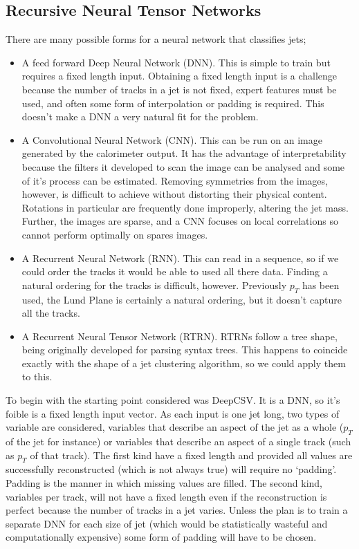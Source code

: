 \FloatBarrier
\subsection{Recursive Neural Tensor Networks}
There are many possible forms for a neural network that classifies jets;
\begin{itemize}
    \item A feed forward Deep Neural Network (DNN). This is simple to train but requires a fixed length input.
        Obtaining a fixed length input is a challenge because the number of tracks in a jet is not fixed,
        expert features must be used, and often some form of interpolation or padding is required. 
        This doesn't make a DNN a very natural fit for the problem.
    \item A Convolutional Neural Network (CNN). This can be run on an image generated by the calorimeter output.
        It has the advantage of interpretability because the filters it developed to scan the image can be analysed and some of it's process can be estimated.
        Removing symmetries from the images, however, is difficult to achieve without distorting their physical content.
        Rotations in particular are frequently done improperly, altering the jet mass.
        Further, the images are sparse, and a CNN focuses on local correlations so cannot perform optimally on spares images.
    \item A Recurrent Neural Network (RNN). This can read in a sequence, so if we could order the tracks it would be able to used all there data.
        Finding a natural ordering for the tracks is difficult, however.
        Previously \(p_T\) has been used, the Lund Plane is certainly a natural ordering,
        but it doesn't capture all the tracks.
    \item A Recurrent Neural Tensor Network (RTRN). RTRNs follow a tree shape, being originally developed for parsing syntax trees.
        This happens to coincide exactly with the shape of a jet clustering algorithm, so we could apply them to this.
\end{itemize}
To begin with the starting point considered was DeepCSV. It is a DNN, so it's foible is a fixed length input vector.
As each input is one jet long, two types of variable are considered, variables that describe an aspect of the jet as a whole
(\(p_T\) of the jet for instance) or variables that describe an aspect of a single track (such as \(p_T\) of that track).
The first kind have a fixed length and provided all values are successfully reconstructed (which is not always true)
will require no `padding'.
Padding is the manner in which missing values are filled.
The second kind, variables per track, will not have a fixed length even if the reconstruction is perfect because the number of tracks in a jet varies.
Unless the plan is to train a separate DNN for each size of jet (which would be statistically wasteful and computationally expensive)
some form of padding will have to be chosen.

